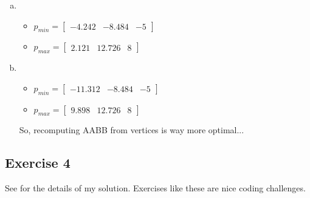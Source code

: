\documentclass[11pt]{article}
\begin{document}
\begin{enumerate}[a.]
\begin{itemize}
		\end{itemize}
	\item %
		\begin{itemize}
			\item $p_{min}=\begin{bmatrix}
				-4.242 & -8.484 & -5
			\end{bmatrix}$
			\item $p_{max}=\begin{bmatrix}
				2.121 & 12.726 & 8
			\end{bmatrix}$
		\end{itemize}
	\item %
		\begin{itemize}
			\item $p_{min}=\begin{bmatrix}
				-11.312 & -8.484 & -5
			\end{bmatrix}$
			\item $p_{max}=\begin{bmatrix}
				9.898 & 12.726 & 8
			\end{bmatrix}$
		\end{itemize}
		So, recomputing AABB from vertices is way more optimal...
\end{enumerate}

\subsection{Exercise 4}

See  for the details of my solution. Exercises like these are nice coding challenges.
\end{document}
